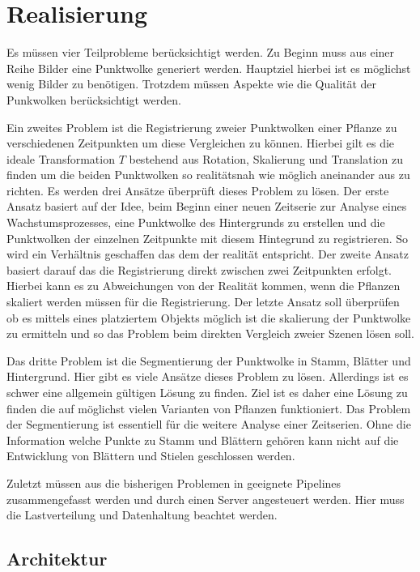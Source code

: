 \documentclass[12pt,titlepage, twoside]{article}
\begin{document}
\newpage
\section{Realisierung}
\label{sec:realisierung}
Es müssen vier Teilprobleme berücksichtigt werden. Zu Beginn muss aus einer Reihe Bilder eine Punktwolke generiert werden. Hauptziel hierbei ist es möglichst wenig Bilder zu benötigen. 
Trotzdem müssen Aspekte wie die Qualität der Punkwolken berücksichtigt werden. 

Ein zweites Problem ist die Registrierung zweier Punktwolken einer Pflanze zu verschiedenen Zeitpunkten um diese Vergleichen zu können. 
Hierbei gilt es die ideale Transformation $T$ bestehend aus Rotation, Skalierung und Translation zu finden um die beiden Punktwolken so realitätsnah wie möglich aneinander aus zu richten.
Es werden drei Ansätze überprüft dieses Problem zu lösen. 
Der erste Ansatz basiert auf der Idee, beim Beginn einer neuen Zeitserie zur Analyse eines Wachstumsprozesses, eine Punktwolke des Hintergrunds zu erstellen und die Punktwolken der einzelnen Zeitpunkte mit diesem Hintegrund zu registrieren. So wird ein Verhältnis geschaffen das dem der realität entspricht.
Der zweite Ansatz basiert darauf das die Registrierung direkt zwischen zwei Zeitpunkten erfolgt. Hierbei kann es zu Abweichungen von der Realität kommen, wenn die Pflanzen skaliert werden müssen für die Registrierung.
Der letzte Ansatz soll überprüfen ob es mittels eines platziertem Objekts möglich ist die skalierung der Punktwolke zu ermitteln und so das Problem beim direkten Vergleich zweier Szenen lösen soll.

Das dritte Problem ist die Segmentierung der Punktwolke in Stamm, Blätter und Hintergrund. Hier gibt es viele Ansätze dieses Problem zu lösen. Allerdings ist es schwer eine allgemein gültigen Lösung zu finden. 
Ziel ist es daher eine Lösung zu finden die auf möglichst vielen Varianten von Pflanzen funktioniert. 
Das Problem der Segmentierung ist essentiell für die weitere Analyse einer Zeitserien. Ohne die Information welche Punkte zu Stamm und Blättern gehören kann nicht auf die Entwicklung von Blättern und Stielen geschlossen werden.

Zuletzt müssen aus die bisherigen Problemen in geeignete Pipelines zusammengefasst werden und durch einen Server angesteuert werden. Hier muss die Lastverteilung und Datenhaltung beachtet werden.

\subsection{Architektur}
\label{sec:realisierung:architektur}
\end{document}
